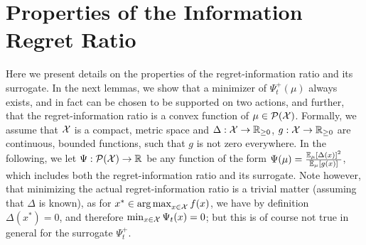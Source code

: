 \section{Properties of the Information Regret Ratio}\label{app: properties of the regret-information ratio}
Here we present details on the properties of the regret-information ratio and its surrogate. In the next lemmas, we show that a minimizer of $\Psi_t^+(\mu)$ always exists, and in fact can be chosen to be supported on two actions, and further, that the regret-information ratio is a convex function of $\mu \in \mathcal{P}(\mathcal{X})$. Formally, we assume that $\mathcal{X}$ is a compact, metric space and $\Delta:\mathcal{X}\rightarrow \mathbb{R}_{\geq 0}$, $g:\mathcal{X} \rightarrow \mathbb{R}_{\geq 0}$ are continuous, bounded functions, such that $g$ is not zero everywhere. In the following, we let $\Psi : \mathcal{P}(\mathcal{X}) \rightarrow \mathbb{R}$ be any function of the form $\Psi(\mu) = \frac{\mathbb{E}_\mu[\Delta(x)]^2}{\mathbb{E}_{\mu}[g(x)]}$, which includes both the regret-information ratio and its surrogate. Note however, that minimizing the actual regret-information ratio is a trivial matter (assuming that $\Delta$ is known), as for $x^* \in \operatorname*{arg\,max}_{x \in \mathcal{X}}f(x)$, we have by definition $\Delta(x^*)=0$, and therefore $\min_{x \in \mathcal{X}} \Psi_t(x) = 0$; but this is of course not true in general for the surrogate $\Psi_t^+$.

